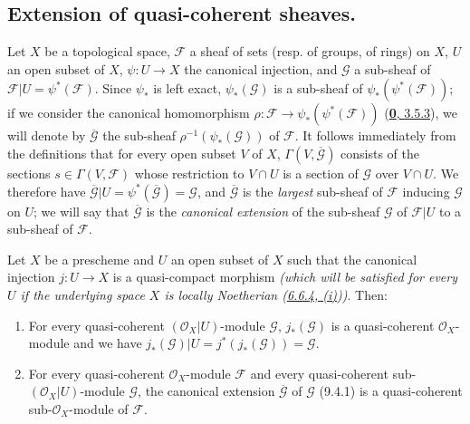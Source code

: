 
\subsection{Extension of quasi-coherent sheaves.}
\label{subsection:I.9.4}

\begin{env}[9.4.1]
\label{I.9.4.1}
Let $X$ be a topological space, $\mathscr{F}$ a sheaf of sets
(resp. of groups, of rings) on $X$, $U$ an open subset of $X$,
$\psi:U\to X$ the canonical injection, and $\mathscr{G}$ a sub-sheaf of
$\mathscr{F}|U=\psi^*(\mathscr{F})$. Since $\psi_*$ is left exact,
$\psi_*(\mathscr{G})$ is a sub-sheaf of
$\psi_*(\psi^*(\mathscr{F}))$; if we consider the canonical homomorphism
$\rho:\mathscr{F}\to\psi_*(\psi^*(\mathscr{F}))$
(\hyperref[0.3.5.3]{\textbf{0}, 3.5.3}), we will denote by
$\overline{\mathscr{G}}$ the sub-sheaf
$\rho^{-1}(\psi_*(\mathscr{G}))$ of $\mathscr{F}$. It follows immediately
from the definitions that for every open subset $V$ of $X$,
$\Gamma(V,\overline{\mathscr{G}})$ consists of the sections
$s\in\Gamma(V,\mathscr{F})$ whose restriction to $V\cap U$ is a section
of $\mathscr{G}$ over $V\cap U$. We therefore have
$\overline{\mathscr{G}}|U=\psi^*(\overline{\mathscr{G}})=\mathscr{G}$, and
$\overline{\mathscr{G}}$ is the \emph{largest} sub-sheaf of
$\mathscr{F}$ inducing $\mathscr{G}$ on $U$; we will say that
$\overline{\mathscr{G}}$ is the \emph{canonical extension} of the
sub-sheaf $\mathscr{G}$ of $\mathscr{F}|U$ to a sub-sheaf of
$\mathscr{F}$.
\end{env}

\begin{proposition}[9.4.2]
\label{I.9.4.2}
Let $X$ be a prescheme and $U$ an open subset of $X$ such that the canonical
injection $j:U\to X$ is a quasi-compact morphism
\emph{(which will be satisfied for \emph{every} $U$ if the underlying space
$X$ is \emph{locally Noetherian}
\textup{(\hyperref[I.6.6.4]{6.6.4, (i)})})}. Then:
\begin{enumerate}
\item[\textup{(i)}] For every quasi-coherent $(\mathscr{O}_X|U)$-module
  $\mathscr{G}$, $j_*(\mathscr{G})$ is a quasi-coherent
  $\mathscr{O}_X$-module and we have
  $j_*(\mathscr{G})|U=j^*(j_*(\mathscr{G}))=\mathscr{G}$.
\item[\textup{(ii)}] For every quasi-coherent $\mathscr{O}_X$-module $\mathscr{F}$
  and every quasi-coherent sub-$(\mathscr{O}_X|U)$-module $\mathscr{G}$, the
  canonical extension $\overline{\mathscr{G}}$ of $\mathscr{G}$ \textup{(9.4.1)}
  is a quasi-coherent sub-$\mathscr{O}_X$-module of $\mathscr{F}$.
\end{enumerate}
\end{proposition}

